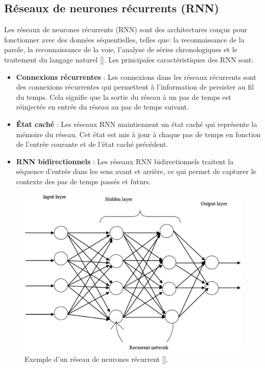 \medskip

\subsection{Réseaux de neurones récurrents (RNN)}
Les réseaux de neurones récurrents (RNN) sont des architectures conçus pour
fonctionner avec des données séquentielles, telles que: la reconnaissance de la
parole, la reconnaissance de la voie, l'analyse de séries chronologiques et le
traitement du langage naturel [\cite{Goodfellow-et-al-2016}]. Les principales
caractéristiques des RNN sont:
\begin{itemize}
	\item \textbf{Connexions récurrentes} : Les connexions dans les réseaux récurrents sont des connexions récurrentes qui permettent à l'information de persister au fil du temps. Cela signifie que la sortie du réseau à un pas de temps est réinjectée en entrée du réseau au pas de temps suivant.
	\item \textbf{État caché} : Les réseaux RNN maintiennent un état caché qui représente la mémoire du réseau. Cet état est mis à jour à chaque pas de temps en fonction de l'entrée courante et de l'état caché précédent.
	\item \textbf{RNN bidirectionnels} : Les réseaux RNN bidirectionnels traitent la séquence d'entrée dans les sens avant et arrière, ce qui permet de capturer le contexte des pas de temps passés et futurs.
\end{itemize}

\begin{figure}[hbt!]
	\centering
	\includegraphics[width=12cm]{images_pfe/rnn.jpg}
	\caption{Exemple d'un réseau de neurones récurrent [\cite{kumaraswamy_2021}].}
	\label{fig:schema-reseau}
\end{figure}
\FloatBarrier

